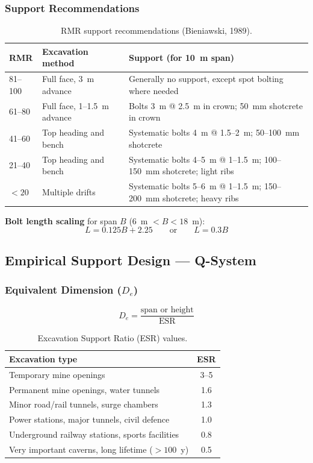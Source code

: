 \documentclass[a4paper,12pt]{article}
\begin{document}
\subsubsection{Support Recommendations}

\begin{table}[ht]
\centering
\small
\begin{tabularx}{\textwidth}{l l X}
\toprule
\textbf{RMR} & \textbf{Excavation method} & \textbf{Support (for 10~m span)} \\
\midrule
81--100 & Full face, 3~m advance & Generally no support, except spot bolting where needed \\
61--80 & Full face, 1--1.5~m advance & Bolts 3~m @ 2.5~m in crown; 50~mm shotcrete in crown \\
41--60 & Top heading and bench & Systematic bolts 4~m @ 1.5--2~m; 50--100~mm shotcrete \\
21--40 & Top heading and bench & Systematic bolts 4--5~m @ 1--1.5~m; 100--150~mm shotcrete; light ribs \\
$<20$ & Multiple drifts & Systematic bolts 5--6~m @ 1--1.5~m; 150--200~mm shotcrete; heavy ribs \\
\bottomrule
\end{tabularx}
\caption{RMR support recommendations (Bieniawski, 1989).}
\end{table}

\textbf{Bolt length scaling} for span $B$ (6~m $< B < 18$~m):
\[
L = 0.125B + 2.25
\qquad \text{or} \qquad
L = 0.3B
\]

\subsection{Empirical Support Design --- Q-System}

\subsubsection{Equivalent Dimension ($D_e$)}
\[
D_e = \frac{\text{span or height}}{\text{ESR}}
\]

\begin{table}[ht]
\centering
\begin{tabularx}{\textwidth}{X c}
\toprule
\textbf{Excavation type} & \textbf{ESR} \\
\midrule
Temporary mine openings & 3--5 \\
Permanent mine openings, water tunnels & 1.6 \\
Minor road/rail tunnels, surge chambers & 1.3 \\
Power stations, major tunnels, civil defence & 1.0 \\
Underground railway stations, sports facilities & 0.8 \\
Very important caverns, long lifetime ($>100$~y) & 0.5 \\
\bottomrule
\end{tabularx}
\caption{Excavation Support Ratio (ESR) values.}
\end{table}
\end{document}
